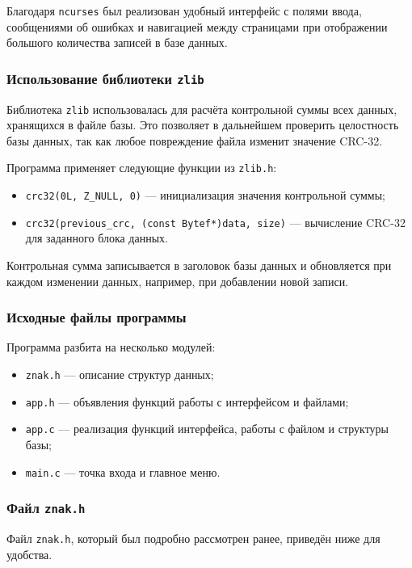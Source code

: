 Благодаря \texttt{ncurses} был реализован удобный интерфейс с полями ввода, сообщениями об ошибках и навигацией между страницами при отображении большого количества записей в базе данных.

\subsubsection{Использование библиотеки \texttt{zlib}}

Библиотека \texttt{zlib} использовалась для расчёта контрольной суммы всех данных, хранящихся в файле базы. Это позволяет в дальнейшем проверить целостность базы данных, так как любое повреждение файла изменит значение CRC-32.

Программа применяет следующие функции из \texttt{zlib.h}:
\begin{itemize}
    \item \texttt{crc32(0L, Z\_NULL, 0)} — инициализация значения контрольной суммы;
    \item \texttt{crc32(previous\_crc, (const Bytef*)data, size)} — вычисление CRC-32 для заданного блока данных.
\end{itemize}

Контрольная сумма записывается в заголовок базы данных и обновляется при каждом изменении данных, например, при добавлении новой записи.

\subsubsection{Исходные файлы программы}

Программа разбита на несколько модулей:

\begin{itemize}
    \item \texttt{znak.h} --- описание структур данных;
    \item \texttt{app.h} --- объявления функций работы с интерфейсом и файлами;
    \item \texttt{app.c} --- реализация функций интерфейса, работы с файлом и структуры базы;
    \item \texttt{main.c} --- точка входа и главное меню.
\end{itemize}

\subsubsection*{Файл \texttt{znak.h}}

\noindent
Файл \texttt{znak.h}, который был подробно рассмотрен ранее, приведён ниже для удобства. 

